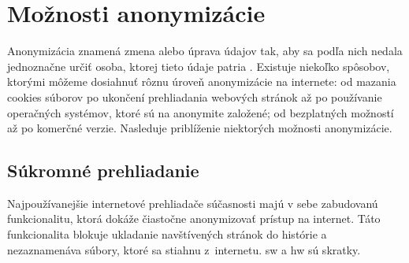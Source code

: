 
\section{Možnosti anonymizácie}
\noindent Anonymizácia znamená zmena alebo úprava údajov tak, aby sa podľa nich nedala jednoznačne určiť osoba, ktorej tieto údaje patria \cite{t01}. Existuje niekoľko spôsobov, ktorými môžeme dosiahnuť rôznu úroveň anonymizácie na internete: od mazania cookies súborov po ukončení prehliadania webových stránok až po používanie operačných systémov, ktoré sú na anonymite založené; od bezplatných možností až po komerčné verzie.
\newline Nasleduje priblíženie niektorých možnosti anonymizácie.

\subsection{Súkromné prehliadanie}
\noindent Najpoužívanejšie internetové prehliadače súčasnosti majú v sebe zabudovanú funkcionalitu, ktorá dokáže čiastočne anonymizovať prístup na internet. Táto funkcionalita blokuje ukladanie navštívených stránok do histórie a nezaznamenáva súbory, ktoré sa stiahnu z~internetu. sw a hw sú skratky.


